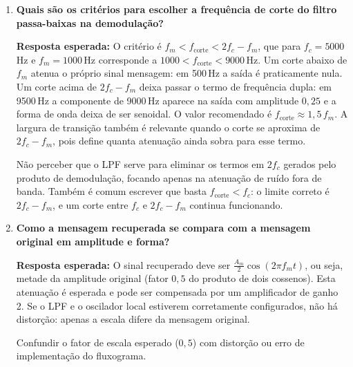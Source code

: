 \documentclass[11pt,a4paper]{article}
\begin{document}
\begin{enumerate}[label=\textbf{Q\arabic*.}, leftmargin=*, itemsep=1em]
    \begin{nota}
      Descrever apenas qualitativamente (``sinal cai'') sem calcular os valores de
      $\cos\theta$ para os erros de fase específicos indicados no roteiro.
      Atenção também ao relatório que registra máximo fora de 0° ou saída não nula
      em 90°: isso indica que o erro de fase foi aplicado no campo
      \textit{Phase Offset} do \texttt{Signal Source}, o que quebra a coerência com
      a portadora de transmissão.  O roteiro atual usa ganhos em quadratura
      justamente para evitar esse caso, e a medição deve seguir $0{,}5\cos\theta$
      com erro abaixo de $1\%$.
    \end{nota}

  \item \textbf{Quais são os critérios para escolher a frequência de corte do filtro passa-baixas na demodulação?}

    \textbf{Resposta esperada:} O critério é $f_m < f_\text{corte} < 2f_c - f_m$,
    que para $f_c = 5000$\,Hz e $f_m = 1000$\,Hz corresponde a
    $1000 < f_\text{corte} < 9000$\,Hz.  Um corte abaixo de $f_m$ atenua o próprio
    sinal mensagem: em 500\,Hz a saída é praticamente nula.  Um corte acima de
    $2f_c - f_m$ deixa passar o termo de frequência dupla: em 9500\,Hz a componente
    de 9000\,Hz aparece na saída com amplitude $0{,}25$ e a forma de onda deixa de ser
    senoidal.  O valor recomendado é $f_\text{corte} \approx 1{,}5\,f_m$.
    A largura de transição também é relevante quando o corte se aproxima de
    $2f_c - f_m$, pois define quanta atenuação ainda sobra para esse termo.

    \begin{nota}
      Não perceber que o LPF serve para eliminar os termos em $2f_c$ gerados pelo
      produto de demodulação, focando apenas na atenuação de ruído fora de banda.
      Também é comum escrever que basta $f_\text{corte} < f_c$: o limite correto é
      $2f_c - f_m$, e um corte entre $f_c$ e $2f_c - f_m$ continua funcionando.
    \end{nota}

  \item \textbf{Como a mensagem recuperada se compara com a mensagem original em amplitude e forma?}

    \textbf{Resposta esperada:} O sinal recuperado deve ser $\tfrac{A_m}{2}\cos(2\pi f_m t)$,
    ou seja, metade da amplitude original (fator $0{,}5$ do produto de dois cossenos).
    Esta atenuação é esperada e pode ser compensada por um amplificador de ganho 2.
    Se o LPF e o oscilador local estiverem corretamente configurados, não há distorção:
    apenas a escala difere da mensagem original.

    \begin{nota}
      Confundir o fator de escala esperado ($0{,}5$) com distorção ou erro de
      implementação do fluxograma.
    \end{nota}

\end{enumerate}
\end{document}
